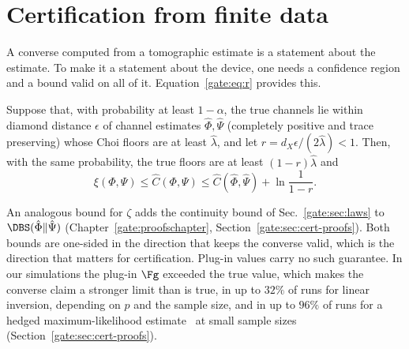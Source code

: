 \section{Certification from finite data}\label{gate:sec:cert}

A converse computed from a tomographic estimate is a statement about the estimate. To make it a statement about the device, one needs a confidence region and a bound valid on all of it. Equation~\eqref{gate:eq:r} provides this.

\begin{theorem}\label{gate:thm:cert}
Suppose that, with probability at least $1-\alpha$, the true channels lie within diamond distance $\epsilon$ of channel estimates $\hat\Phi,\hat\Psi$ (completely positive and trace preserving) whose Choi floors are at least $\hat\lambda$, and let $r=d_X\epsilon/(2\hat\lambda)<1$. Then, with the same probability, the true floors are at least $(1-r)\hat\lambda$ and
\begin{equation}\label{gate:eq:cert}
\xi(\Phi,\Psi)\le\hat C(\Phi,\Psi)\le\hat C(\hat\Phi,\hat\Psi)+\ln\frac{1}{1-r}.
\end{equation}
\end{theorem}

An analogous bound for $\zeta$ adds the continuity bound of Sec.~\ref{gate:sec:laws} to $\DBS(\hat\Phi\|\hat\Psi)$ (Chapter~\ref{gate:proofschapter}, Section~\ref{gate:sec:cert-proofs}). Both bounds are one-sided in the direction that keeps the converse valid, which is the direction that matters for certification. Plug-in values carry no such guarantee. In our simulations the plug-in $\Fg$ exceeded the true value, which makes the converse claim a stronger limit than is true, in up to $32\%$ of runs for linear inversion, depending on $p$ and the sample size, and in up to $96\%$ of runs for a hedged maximum-likelihood estimate~\cite{BlumeKohout2010} at small sample sizes (Section~\ref{gate:sec:cert-proofs}).

